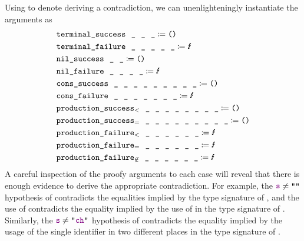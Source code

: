   Using \Lightning{} to denote deriving a contradiction, we can unenlighteningly instantiate the arguments as
  \begin{align*}
    & \fname{terminal\_success}~~\termhole~~\termhole~~\termhole \defeq \unittt \\
    & \fname{terminal\_failure}~~\termhole~~\termhole~~\termhole~~\termhole~~\termhole \defeq \text{\Lightning} \\
    & \fname{nil\_success}~~\termhole~~\termhole \defeq \unittt \\
    & \fname{nil\_failure}~~\termhole~~\termhole~~\termhole~~\termhole \defeq \text{\Lightning} \\
    & \fname{cons\_success}~~\termhole~~\termhole~~\termhole~~\termhole~~\termhole~~\termhole~~\termhole~~\termhole~~\termhole \defeq \unittt \\
    & \fname{cons\_failure}~~\termhole~~\termhole~~\termhole~~\termhole~~\termhole~~\termhole~~\termhole \defeq \text{\Lightning} \\
    & \fname{production\_success$_<$}~~\termhole~~\termhole~~\termhole~~\termhole~~\termhole~~\termhole~~\termhole~~\termhole \defeq \unittt \\
    & \fname{production\_success$_=$}~~\termhole~~\termhole~~\termhole~~\termhole~~\termhole~~\termhole~~\termhole~~\termhole~~\termhole \defeq \unittt \\
    & \fname{production\_failure$_<$}~~\termhole~~\termhole~~\termhole~~\termhole~~\termhole~~\termhole \defeq \text{\Lightning} \\
    & \fname{production\_failure$_=$}~~\termhole~~\termhole~~\termhole~~\termhole~~\termhole~~\termhole \defeq \text{\Lightning} \\
    & \fname{production\_failure$_{\not\in}$}~~\termhole~~\termhole~~\termhole~~\termhole~~\termhole~~\termhole \defeq \text{\Lightning}
  \end{align*}
  A careful inspection of the proofy arguments to each  case will reveal that there is enough evidence to derive the appropriate contradiction.  For example, the $\farg{s}\neq\str{}$ hypothesis of  contradicts the equalities implied by the type signature of , and the use of \nil\space contradicts the equality implied by the use of  in the type signature of .  Similarly, the $\farg{s}\neq\str{\farg{ch}}$ hypothesis of  contradicts the equality implied by the usage of the single identifier  in two different places in the type signature of .

